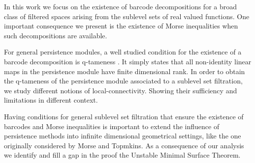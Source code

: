 In this work we focus on the existence of barcode decompositions for a broad class of filtered spaces arising from the sublevel sets of real valued functions.
One important consequence we present is the existence of Morse inequalities when such decompositions are available.  

For general persistence modules, a well studied condition for the existence of a barcode decomposition is q-tameness \cite{Chazal.2016a,Chazal.2016b}.
It simply states that all non-identity linear maps in the persistence module have finite dimensional rank.
In order to obtain the q-tameness of the persistence module associated to a sublevel set filtration, we study different notions of local-connectivity.
Showing their sufficiency and limitations in different context.

Having conditions for general sublevel set filtration that ensure the existence of barcodes and Morse inequalities is important to extend the influence of persistence methods into infinite dimensional geometrical settings, like the one originally considered by Morse and Topmkins.
As a consequence of our analysis we identify and fill a gap in the proof the Unstable Minimal Surface Theorem.







